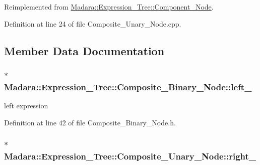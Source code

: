 Reimplemented from \hyperlink{classMadara_1_1Expression__Tree_1_1Component__Node_a672f2b18b4e63efda38e9063a47bc30f}{Madara::Expression\_\-Tree::Component\_\-Node}.



Definition at line 24 of file Composite\_\-Unary\_\-Node.cpp.



\subsection{Member Data Documentation}
\hypertarget{classMadara_1_1Expression__Tree_1_1Composite__Binary__Node_acac60a70beb2484737e6e7161edb2d1b}{
\subsubsection[{left\_\-}]{$\ast$ {\bf Madara::Expression\_\-Tree::Composite\_\-Binary\_\-Node::left\_\-}}}
\label{df/d55/classMadara_1_1Expression__Tree_1_1Composite__Binary__Node_acac60a70beb2484737e6e7161edb2d1b}


left expression 



Definition at line 42 of file Composite\_\-Binary\_\-Node.h.

\hypertarget{classMadara_1_1Expression__Tree_1_1Composite__Unary__Node_a077b7bd1b52df6f5c6adfde735556a68}{
\subsubsection[{right\_\-}]{$\ast$ {\bf Madara::Expression\_\-Tree::Composite\_\-Unary\_\-Node::right\_\-}}}
\label{d3/dc7/classMadara_1_1Expression__Tree_1_1Composite__Unary__Node_a077b7bd1b52df6f5c6adfde735556a68}


